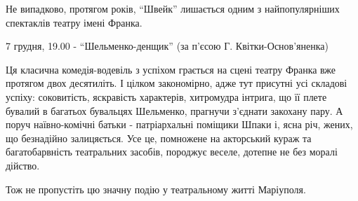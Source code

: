 Не випадково, протягом років, \enquote{Швейк} лишається одним з найпопулярніших
спектаклів театру імені Франка.

7 грудня, 19.00 -  \enquote{Шельменко-денщик} (за п'єсою Г. Квітки-Основ'яненка)

Ця класична комедія-водевіль з успіхом грається на сцені театру Франка вже
протягом двох десятиліть. І цілком закономірно, адже тут присутні усі складові
успіху: соковитість, яскравість характерів, хитромудра інтрига, що її плете
бувалий в багатьох бувальцях Шельменко, прагнучи з'єднати закохану пару. А
поруч наївно-комічні батьки - патріархальні поміщики Шпаки і, ясна річ, жених,
що безнадійно залицяється. Усе це, помножене на акторський кураж та
багатобарвність театральних засобів, породжує веселе, дотепне не без моралі
дійство.

Тож не пропустіть цю значну подію у театральному житті Маріуполя.
